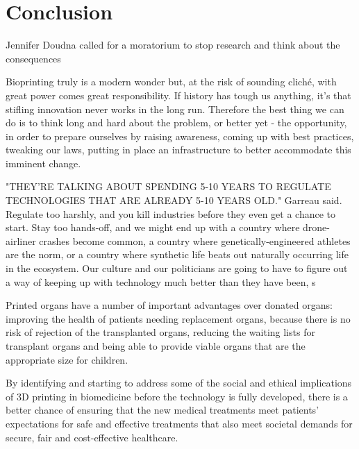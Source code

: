 \documentclass[12pt]{article} %
\begin{document}
\newpage 

\section{Conclusion} %
Jennifer Doudna called for a moratorium to stop research and think about the consequences

Bioprinting truly is a modern wonder but, at the risk of sounding cliché, with great power comes great responsibility. If history has tough us anything, it's that stifling innovation never works in the long run. Therefore the best thing we can do is to think long and hard about the problem, or better yet - the opportunity, in order to prepare ourselves by raising awareness, coming up with best practices, tweaking our laws, putting in place an infrastructure to better accommodate this imminent change.


"THEY'RE TALKING ABOUT SPENDING 5-10 YEARS TO REGULATE TECHNOLOGIES THAT ARE ALREADY 5-10 YEARS OLD." Garreau said.
Regulate too harshly, and you kill industries before they even get a chance to start. Stay too hands-off, and we might end up with a country where drone-airliner crashes become common, a country where genetically-engineered athletes are the norm, or a country where synthetic life beats out naturally occurring life in the ecosystem. 
Our culture and our politicians are going to have to figure out a way of keeping up with technology much better than they have been, s

Printed organs have a number of important advantages over donated organs: improving the health of patients needing replacement organs, because there is no risk of rejection of the transplanted organs, reducing the waiting lists for transplant organs and being able to provide viable organs that are the appropriate size for children.

By identifying and starting to address some of the social and ethical implications of 3D printing in biomedicine before the technology is fully developed, there is a better chance of ensuring that the new medical treatments meet patients’ expectations for safe and effective treatments that also meet societal demands for secure, fair and cost-effective healthcare.
\newpage

\end{document}
